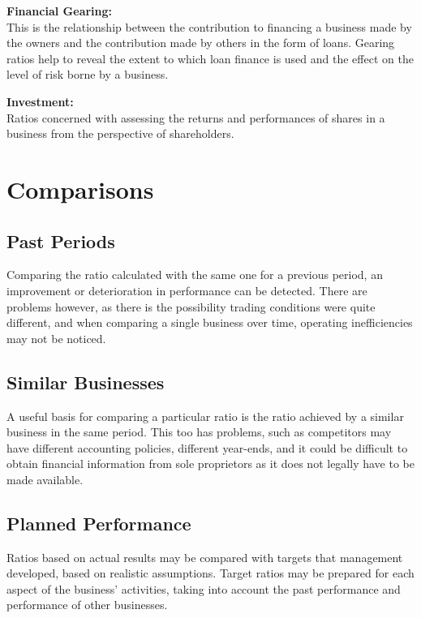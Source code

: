 \documentclass{report}
\newenvironment{blackbox}[1][Black]
  {\begin{tcolorbox}[colframe=#1,colback=white]}
  {\end{tcolorbox}}
\begin{document}
\begin{blackbox}
    \textbf{Financial Gearing:}\\
    This is the relationship between the contribution to financing a business made by the owners and the contribution made by others in the form of loans. Gearing ratios help to reveal the extent to which loan finance is used and the effect on the level of risk borne by a business.
\end{blackbox}

\begin{blackbox}
    \textbf{Investment:}\\
    Ratios concerned with assessing the returns and performances of shares in a business from the perspective of shareholders.
\end{blackbox}

\section{Comparisons}

\subsection{Past Periods}
Comparing the ratio calculated with the same one for a previous period, an improvement or deterioration in performance can be detected. There are problems however, as there is the possibility trading conditions were quite different, and when comparing a single business over time, operating inefficiencies may not be noticed.

\subsection{Similar Businesses}
A useful basis for comparing a particular ratio is the ratio achieved by a similar business in the same period. This too has problems, such as competitors may have different accounting policies, different year-ends, and it could be difficult to obtain financial information from sole proprietors as it does not legally have to be made available.

\subsection{Planned Performance}
Ratios based on actual results may be compared with targets that management developed, based on realistic assumptions. Target ratios may be prepared for each aspect of the business' activities, taking into account the past performance and performance of other businesses.
\end{document}
